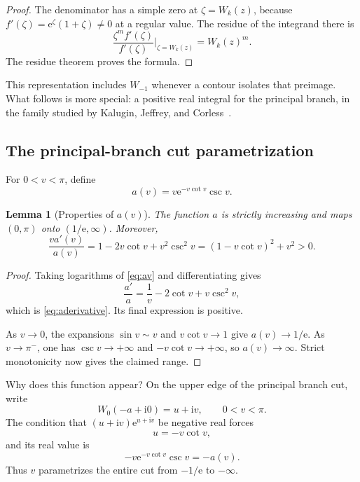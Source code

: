 \documentclass[11pt]{article}
\newtheorem{lemma}[theorem]{Lemma}
\theoremstyle{remark}
\newcommand{\ee}{\mathrm e}
\newcommand{\ii}{\mathrm i}
\begin{document}
\begin{proof}
The denominator has a simple zero at \(\zeta=W_k(z)\), because
\(f'(\zeta)=\ee^\zeta(1+\zeta)\neq0\) at a regular value.  The residue of the
integrand there is
\[
 \frac{\zeta^m f'(\zeta)}{f'(\zeta)}
 \bigg|_{\zeta=W_k(z)}
 =W_k(z)^m.
\]
The residue theorem proves the formula.
\end{proof}

This representation includes \(W_{-1}\) whenever a contour isolates that
preimage.  What follows is more special: a positive real integral for the principal
branch, in the family studied by Kalugin, Jeffrey, and
Corless~\cite{kalugin2012}.

\subsection{The principal-branch cut parametrization}

For \(0<v<\pi\), define
\begin{equation}\label{eq:av}
       a(v)=v\ee^{-v\cot v}\csc v.
\end{equation}

\begin{lemma}[Properties of \(a(v)\)]\label{lem:av}
The function \(a\) is strictly increasing and maps \((0,\pi)\) onto
\((1/\ee,\infty)\).  Moreover,
\begin{equation}\label{eq:aderivative}
 \frac{v a'(v)}{a(v)}
 =1-2v\cot v+v^2\csc^2v
 =(1-v\cot v)^2+v^2>0.
\end{equation}
\end{lemma}

\begin{proof}
Taking logarithms of \eqref{eq:av} and differentiating gives
\[
 \frac{a'}a=\frac1v-2\cot v+v\csc^2v,
\]
which is \eqref{eq:aderivative}.  Its final expression is positive.

As \(v\to0\), the expansions
\(\sin v\sim v\) and \(v\cot v\to1\) give \(a(v)\to1/\ee\).
As \(v\to\pi^-\), one has \(\csc v\to+\infty\) and
\(-v\cot v\to+\infty\), so \(a(v)\to\infty\).  Strict monotonicity now gives
the claimed range.
\end{proof}

Why does this function appear?  On the upper edge of the principal branch
cut, write
\[
       W_0(-a+\ii0)=u+\ii v,\qquad 0<v<\pi.
\]
The condition that \((u+\ii v)\ee^{u+\ii v}\) be negative real forces
\[
       u=-v\cot v,
\]
and its real value is
\[
       -v\ee^{-v\cot v}\csc v=-a(v).
\]
Thus \(v\) parametrizes the entire cut from \(-1/\ee\) to \(-\infty\).
\end{document}
